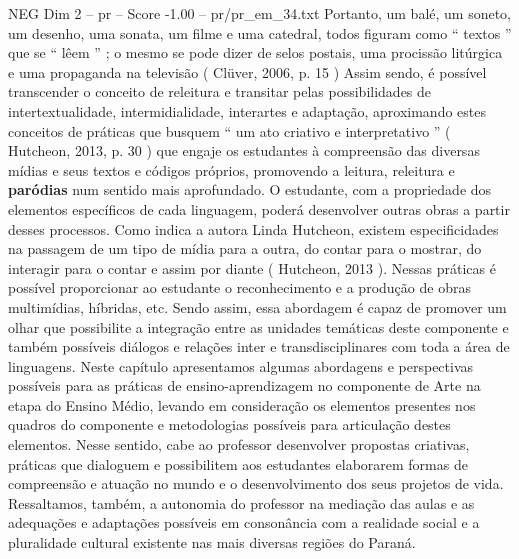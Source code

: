 \begin{textsample}{NEG Dim 2 – pr – Score -1.00 – pr/pr\_em\_34.txt}
Portanto, um balé, um soneto, um desenho, uma sonata, um filme e uma catedral, todos figuram como “ textos ” que se “ lêem ” ; o mesmo se pode dizer de selos postais, uma procissão litúrgica e uma propaganda na televisão ( Clüver, 2006, p. 15 ) Assim sendo, é possível transcender o conceito de releitura e transitar pelas possibilidades de intertextualidade, intermidialidade, interartes e adaptação, aproximando estes conceitos de práticas que busquem “ um ato criativo e interpretativo ” ( Hutcheon, 2013, p. 30 ) que engaje os estudantes à compreensão das diversas mídias e seus textos e códigos próprios, promovendo a leitura, releitura e \textbf{paródias} num sentido mais aprofundado.
O estudante, com a propriedade dos elementos específicos de cada linguagem, poderá desenvolver outras obras a partir desses processos.
Como indica a autora Linda Hutcheon, existem especificidades na passagem de um tipo de mídia para a outra, do contar para o mostrar, do interagir para o contar e assim por diante ( Hutcheon, 2013 ).
Nessas práticas é possível proporcionar ao estudante o reconhecimento e a produção de obras multimídias, híbridas, etc.
Sendo assim, essa abordagem é capaz de promover um olhar que possibilite a integração entre as unidades temáticas deste componente e também possíveis diálogos e relações inter e transdisciplinares com toda a área de linguagens.
Neste capítulo apresentamos algumas abordagens e perspectivas possíveis para as práticas de ensino-aprendizagem no componente de Arte na etapa do Ensino Médio, levando em consideração os elementos presentes nos quadros do componente e metodologias possíveis para articulação destes elementos.
Nesse sentido, cabe ao professor desenvolver propostas criativas, práticas que dialoguem e possibilitem aos estudantes elaborarem formas de compreensão e atuação no mundo e o desenvolvimento dos seus projetos de vida.
Ressaltamos, também, a autonomia do professor na mediação das aulas e as adequações e adaptações possíveis em consonância com a realidade social e a pluralidade cultural existente nas mais diversas regiões do Paraná.

\end{textsample}
